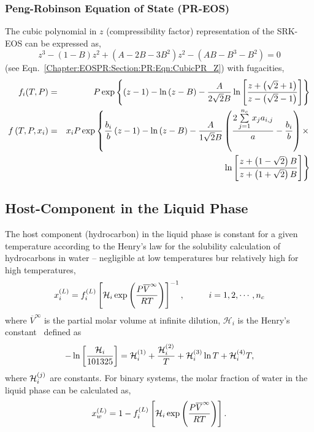 \subsubsection{Peng-Robinson Equation of State (PR-EOS)}\label{Chapter:Hydrate:Section:FugacityModels:Section:L_V:Section:PREOS}
The cubic polynomial in $z$ (compressibility factor) representation of the SRK-EOS can be expressed as,
   \begin{displaymath}
      z^{3} -\left(1-B\right)z^{2} + \left(A-2B-3B^{2}\right)z^{2} - \left(AB -B^{3} - B^{2}\right) = 0
   \end{displaymath}
(see Eqn.~\ref{Chapter:EOSPR:Section:PR:Eqn:CubicPR_Z}) with fugacities,
   \begin{eqnarray}
      f_{i}(T,P) &=& P\exp{\left\{\left(z-1\right)-\ln{\left(z-B\right)}-\frc{A}{2\sqrt{2}B}\ln{\left[\frc{z + \left(\sqrt{2}+1\right)}{z-\left(\sqrt{2}-1\right)}\right]}\right\}}  \\
      f\left(T,P,x_{i}\right) &=& x_{i}P\exp\left\{\frc{b_{i}}{b}\left(z-1\right)-\ln{\left(z-B\right)}-\frc{A}{1\sqrt{2}B}\left(\frc{2\sum\limits_{j=1}^{n_{c}}x_{j}a_{i,j}}{a}-\frc{b_{i}}{b}\right) \times \right.\nonumber \\
                              && \hspace{6cm}\left.\ln{\left[\frc{z + \left(1-\sqrt{2}\right)B}{z +\left(1+\sqrt{2}\right)B}\right]}\right\} 
   \end{eqnarray}

\subsection{Host-Component in the Liquid Phase}\label{Chapter:Hydrate:Section:FugacityModels:Section:HostLiquid}
The host component (hydrocarbon) in the liquid phase is constant for a given temperature according to the Henry's law for the solubility calculation of hydrocarbons in water -- negligible at low temperatures bur relatively high for high temperatures,
   \begin{equation}
      \mfr[x]{i}{L} = \mfr[f]{i}{L}\left[\mathcal{H}_{i}\exp{\left(\frc{P\overline{V}^{\infty}}{RT}\right)}\right]^{-1},\hspace{1cm} i=1,2,\cdots,n_{c}
   \end{equation}
where $\overline{V}^{\infty}$ is the partial molar volume at infinite dilution, $\mathcal{H}_{i}$ is the Henry's constant~\citep{Prausnitz_2000} defined as
   \begin{equation}
      -\ln{\left[\frc{\mathcal{H}_{i}}{101325}\right]} = \mfr[\mathcal{H}]{i}{1} + \frc{\mfr[\mathcal{H}]{i}{2}}{T} + \mfr[\mathcal{H}]{i}{3}\ln{T} +  \mfr[\mathcal{H}]{i}{4}T,
   \end{equation}
where $\mfr[\mathcal{H}]{i}{j}$ are constants. For binary systems, the molar fraction of water in the liquid phase can be calculated as,
   \begin{equation}
     \mfr[x]{w}{L} = 1 - \mfr[f]{i}{L}\left[\mathcal{H}_{i}\exp{\left(\frc{P\overline{V}^{\infty}}{RT}\right)}\right].
   \end{equation}




